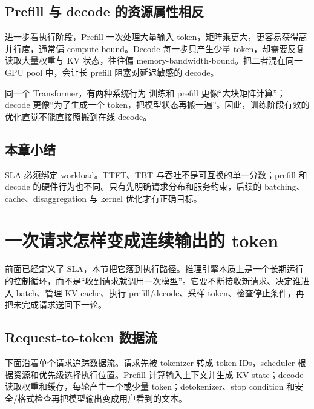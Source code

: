 \documentclass[a4paper]{article}
\begin{document}

\subsection{Prefill 与 decode 的资源属性相反}

进一步看执行阶段，Prefill 一次处理大量输入 token，矩阵乘更大，更容易获得高并行度，通常偏 compute-bound。Decode 每一步只产生少量 token，却需要反复读取大量权重与 KV 状态，往往偏 memory-bandwidth-bound。把二者混在同一 GPU pool 中，会让长 prefill 阻塞对延迟敏感的 decode。

\begin{importantbox}{同一个 Transformer，有两种系统行为}
训练和 prefill 更像“大块矩阵计算”；decode 更像“为了生成一个 token，把模型状态再搬一遍”。因此，训练阶段有效的优化直觉不能直接照搬到在线 decode。
\end{importantbox}

\subsection{本章小结}

SLA 必须绑定 workload。TTFT、TBT 与吞吐不是可互换的单一分数；prefill 和 decode 的硬件行为也不同。只有先明确请求分布和服务约束，后续的 batching、cache、disaggregation 与 kernel 优化才有正确目标。

\section{一次请求怎样变成连续输出的 token}

前面已经定义了 SLA，本节把它落到执行路径。推理引擎本质上是一个长期运行的控制循环，而不是“收到请求就调用一次模型”。它要不断接收新请求、决定谁进入 batch、管理 KV cache、执行 prefill/decode、采样 token、检查停止条件，再把未完成请求送回下一轮。

\subsection{Request-to-token 数据流}

下面沿着单个请求追踪数据流。请求先被 tokenizer 转成 token IDs，scheduler 根据资源和优先级选择执行位置。Prefill 计算输入上下文并生成 KV state；decode 读取权重和缓存，每轮产生一个或少量 token；detokenizer、stop condition 和安全/格式检查再把模型输出变成用户看到的文本。
\end{document}
